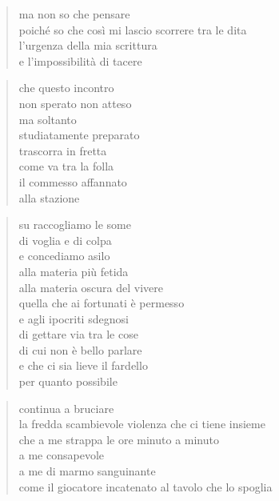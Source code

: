 	\begin{verse}
		ma non so che pensare\\
		poiché so che così mi lascio scorrere tra le dita\\
		l'urgenza della mia scrittura\\
		e l'impossibilità di tacere
	\end{verse}

\clearpage


\vspace*{2cm}

	\begin{verse}
		che questo incontro\\
		non sperato non atteso\\
		ma soltanto\\
		studiatamente preparato\\
		trascorra in fretta\\
		come va tra la folla\\
		il commesso affannato\\
		alla stazione
	\end{verse}

\clearpage


\vspace*{2cm}

	\begin{verse}
		su raccogliamo le some\\
		di voglia e di colpa\\
		e concediamo asilo\\
		alla materia più fetida\\
		alla materia oscura del vivere\\
		quella che ai fortunati è permesso\\
		e agli ipocriti sdegnosi\\
		di gettare via tra le cose\\
		di cui non è bello parlare\\
		e che ci sia lieve il fardello\\
		per quanto possibile
	\end{verse}

\clearpage


\vspace*{2cm}

	\begin{verse}
		continua a bruciare\\
		la fredda scambievole violenza che ci tiene insieme\\
		che a me strappa le ore minuto a minuto\\
		a me consapevole\\
		a me di marmo sanguinante\\
		come il giocatore incatenato al tavolo che lo spoglia
	\end{verse}

